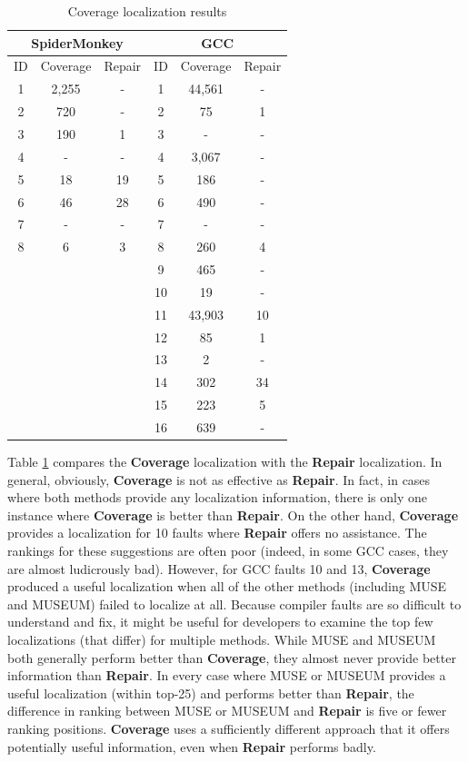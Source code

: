 \begin{table}
\centering
{\scriptsize
\begin{tabular}{|c||c|c||c||c|c|}
\hline
\multicolumn{3}{|c|}{SpiderMonkey}&\multicolumn{3}{|c|}{GCC}\\
\hline
ID & Coverage & Repair & ID & Coverage & Repair\\
\hline
1 & 2,255 & - & 1 & 44,561 & -\\
2 & 720 & - & 2 & 75 & 1\\
3 & 190 & 1 & 3 & - & -\\
4 &  - & - & 4 & 3,067 & -\\
5 & 18 & 19 & 5 & 186 & - \\
6 & 46 & 28 & 6 & 490 & - \\
7 & - & - & 7 & - & -\\
8 & 6 & 3 & 8 &260 & 4\\
   &    &    & 9 & 465 & - \\
   &    &    & 10 & 19 & - \\
   &    &    & 11 & 43,903 & 10 \\
   &    &    & 12 & 85 & 1 \\
   &    &    & 13 & 2 & - \\
   &    &    & 14 & 302 & 34 \\
   &    &    & 15 & 223 & 5 \\
   &    &    & 16 & 639 & - \\
\hline
\end{tabular}
}
\caption{Coverage localization results}
\label{covtable}
\end{table}


Table \ref{covtable} compares the {\bf Coverage} localization with the {\bf Repair} localization.  In general, obviously, {\bf Coverage} is not as effective as {\bf Repair}.  In fact, in cases where both methods provide any localization information, there is only one instance where {\bf Coverage} is better than {\bf Repair}.  On the other hand, {\bf Coverage} provides a localization for 10 faults where {\bf Repair} offers no assistance.  The rankings for these suggestions are often poor (indeed, in some GCC cases, they are almost ludicrously bad).  However, for GCC faults 10 and 13, {\bf Coverage} produced a useful localization when all of the other methods (including MUSE and MUSEUM) failed to localize at all.  Because compiler faults are so difficult to understand and fix, it might be useful for developers to examine the top few localizations (that differ) for multiple methods.  While MUSE and MUSEUM both generally perform better than {\bf Coverage}, they almost never provide better information than {\bf Repair}.  In every case where MUSE or MUSEUM provides a useful localization (within top-25) and performs better than {\bf Repair}, the difference in ranking between MUSE or MUSEUM and {\bf Repair} is five or fewer ranking positions.  {\bf Coverage} uses a sufficiently different approach that it offers potentially useful information, even when {\bf Repair} performs badly.

